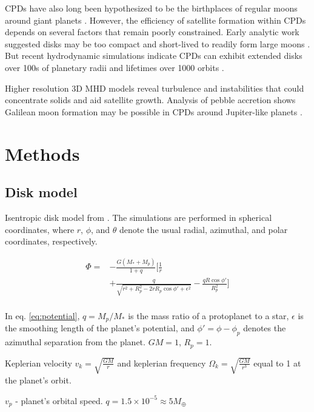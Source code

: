 \documentclass[twocolumn]{aastex631}
\begin{document}
CPDs have also long been hypothesized to be the birthplaces of regular moons around giant planets \citep{Lunine1982,Canup2006}. 
However, the efficiency of satellite formation within CPDs depends on several factors that remain poorly constrained. Early analytic work suggested disks 
may be too compact and short-lived to readily form large moons \citep{Goodman2001}. But recent hydrodynamic simulations indicate CPDs can exhibit 
extended disks over 100s of planetary radii and lifetimes over 1000 orbits \citep{Szul2016,Fujii2017}.

Higher resolution 3D MHD models reveal turbulence and instabilities that could concentrate solids and aid satellite growth. 
Analysis of pebble accretion shows Galilean moon formation may be possible in CPDs around Jupiter-like planets \citep{Shibaike2017,Ronnet2018}. 


\section{Methods}
\label{sec:methods}

\subsection{Disk model}
Isentropic disk model from \citet{Fung_2017}.
The simulations are performed in spherical coordinates, where $r$, $\phi$, and $\theta$ denote the usual radial, azimuthal, and polar coordinates, respectively. 

\begin{equation}\label{eq:potential}
\begin{aligned}
     \Phi = & -\frac{G(M_*+M_p)}{1+q} \bigg[\frac{1}{r} \\
     & + \frac{q}{\sqrt{r^2+R_p^2-2rR_p\cos{\phi'}+\epsilon^2}} - \frac{qR\cos{\phi'}}{R_p^2}\bigg] \\
\end{aligned}
\end{equation}

In eq. \ref{eq:potential}, $q = M_p/M_*$ is the mass ratio of a protoplanet to a star, $\epsilon$ is the smoothing length of the planet's potential, and $\phi'= \phi-\phi_p$ denotes the azimuthal separation from the planet. $GM=1$, $R_p=1$.

Keplerian velocity $v_k=\sqrt{\frac{GM}{r}}$ and keplerian frequency $\Omega_k=\sqrt{\frac{GM}{r^3}}$ equal to 1 at the planet's orbit.

$v_p$ - planet's orbital speed. 
$q = 1.5\times 10^{-5} \approx 5 M_{\oplus}$
\end{document}
